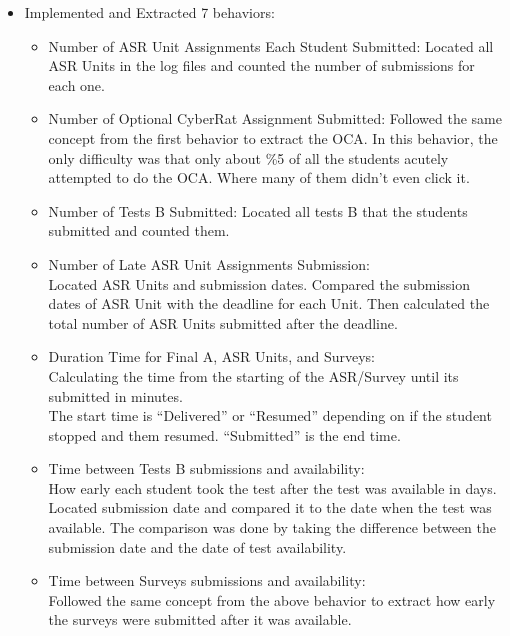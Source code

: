 \documentclass[12pt]{article}
\begin{document}
	\begin{itemize}
		\item Implemented and Extracted 7 behaviors: 
		\begin{itemize}
			\item Number of ASR Unit Assignments Each Student Submitted: Located all ASR Units in the log files and counted the number of submissions for each one. 
			\item Number of Optional CyberRat Assignment Submitted:
Followed the same concept from the first behavior to extract the OCA. In this behavior, the only difficulty was that only about \%5 of all the students acutely attempted to do the OCA. Where many of them didn’t even click it.
\item Number of Tests B Submitted:
Located all tests B that the students submitted and counted them.
\item Number of Late ASR Unit Assignments Submission: \\
Located ASR Units and submission dates. Compared the submission dates of ASR Unit with the deadline for each Unit. Then calculated the total number of ASR Units submitted after the deadline. 
\item Duration Time for Final A, ASR Units, and Surveys: \\
	Calculating the time from the starting of the ASR/Survey until its submitted in minutes.\\ The start time is “Delivered” or “Resumed” depending on if the student stopped and them resumed. “Submitted” is the end time.  
	\item Time between Tests B submissions and availability: \\ How early each student took the test after the test was available in days. \\
Located submission date and compared it to the date when the test was available. The comparison was done by taking the difference between the submission date and the date of test availability.
	\item Time between Surveys submissions and availability: \\
		Followed the same concept from the above behavior to extract how early the surveys were submitted after it was available.\\
		\end{itemize}
	\end{itemize}
\end{document}
